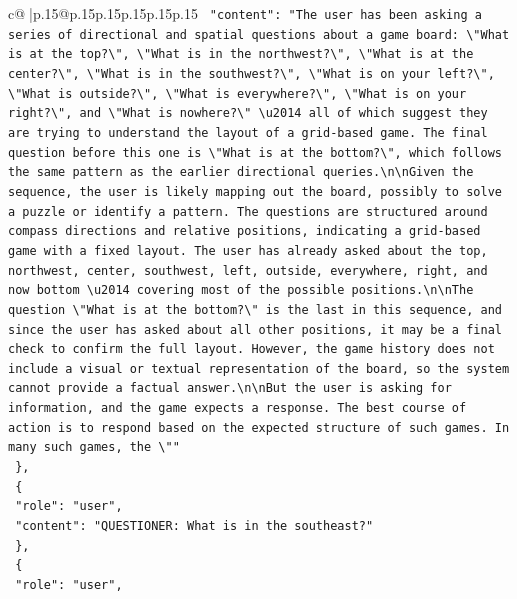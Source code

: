 \documentclass{article}
\begin{document}
{\begin{supertabular}{c@{$\;$}|p{.15\linewidth}@{}p{.15\linewidth}p{.15\linewidth}p{.15\linewidth}p{.15\linewidth}p{.15\linewidth}}
{{{\texttt{    "content": "The user has been asking a series of directional and spatial questions about a game board: \textbackslash{}"What is at the top?\textbackslash{}", \textbackslash{}"What is in the northwest?\textbackslash{}", \textbackslash{}"What is at the center?\textbackslash{}", \textbackslash{}"What is in the southwest?\textbackslash{}", \textbackslash{}"What is on your left?\textbackslash{}", \textbackslash{}"What is outside?\textbackslash{}", \textbackslash{}"What is everywhere?\textbackslash{}", \textbackslash{}"What is on your right?\textbackslash{}", and \textbackslash{}"What is nowhere?\textbackslash{}" \textbackslash{}u2014 all of which suggest they are trying to understand the layout of a grid{-}based game. The final question before this one is \textbackslash{}"What is at the bottom?\textbackslash{}", which follows the same pattern as the earlier directional queries.\textbackslash{}n\textbackslash{}nGiven the sequence, the user is likely mapping out the board, possibly to solve a puzzle or identify a pattern. The questions are structured around compass directions and relative positions, indicating a grid{-}based game with a fixed layout. The user has already asked about the top, northwest, center, southwest, left, outside, everywhere, right, and now bottom \textbackslash{}u2014 covering most of the possible positions.\textbackslash{}n\textbackslash{}nThe question \textbackslash{}"What is at the bottom?\textbackslash{}" is the last in this sequence, and since the user has asked about all other positions, it may be a final check to confirm the full layout. However, the game history does not include a visual or textual representation of the board, so the system cannot provide a factual answer.\textbackslash{}n\textbackslash{}nBut the user is asking for information, and the game expects a response. The best course of action is to respond based on the expected structure of such games. In many such games, the \textbackslash{}""} \\
\texttt{  \},} \\
\texttt{  \{} \\
\texttt{    "role": "user",} \\
\texttt{    "content": "QUESTIONER: What is in the southeast?"} \\
\texttt{  \},} \\
\texttt{  \{} \\
\texttt{    "role": "user",} \\
}}}
\end{supertabular}}
\end{document}
